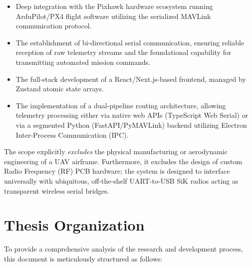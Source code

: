 \begin{itemize}
    \item Deep integration with the Pixhawk hardware ecosystem running ArduPilot/PX4 flight software utilizing the serialized MAVLink communication protocol.
    \item The establishment of bi-directional serial communication, ensuring reliable reception of raw telemetry streams and the foundational capability for transmitting automated mission commands.
    \item The full-stack development of a React/Next.js-based frontend, managed by Zustand atomic state arrays.
    \item The implementation of a dual-pipeline routing architecture, allowing telemetry processing either via native web APIs (TypeScript Web Serial) or via a segmented Python (FastAPI/PyMAVLink) backend utilizing Electron Inter-Process Communication (IPC).
\end{itemize}

The scope explicitly \textit{excludes} the physical manufacturing or aerodynamic engineering of a UAV airframe. Furthermore, it excludes the design of custom Radio Frequency (RF) PCB hardware; the system is designed to interface universally with ubiquitous, off-the-shelf UART-to-USB SiK radios acting as transparent wireless serial bridges.

\section{Thesis Organization}
To provide a comprehensive analysis of the research and development process, this document is meticulously structured as follows:

